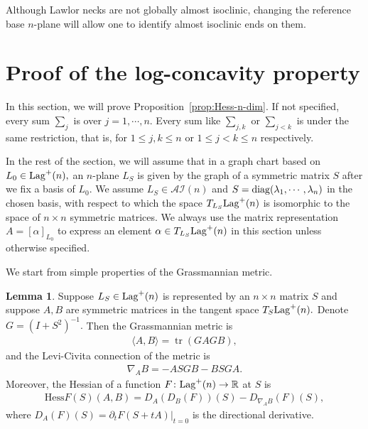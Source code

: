 \documentclass[11pt]{amsart}
\numberwithin{equation}{section}
\theoremstyle{definition}
\theoremstyle{definition}
\newtheorem{lemma}[equation]{Lemma}
\newcommand{\bb}[1]{\mathbb{#1}} \newcommand{\td}[1]{\widetilde{#1}}
\newcommand{\Hess}{\text{Hess}}
\newcommand{\bd}{\partial}
\begin{document}
Although Lawlor necks are not globally almost isoclinic, changing the reference base $n$-plane will allow one to identify almost isoclinic ends on them.



\section{\bf Proof of the log-concavity property}
\label{sec:proof-Lambda}

In this section, we will prove Proposition~\ref{prop:Hess-n-dim}.
If not specified, every sum $\sum\limits_j$ is over $j=1,\cdots,n.$
Every sum like $\sum\limits_{j,k}$ or $\sum\limits_{j<k}$ is under the same restriction, that is, for $1\le j,k\le n$ or $1\le j<k\le n$ respectively.



In the rest of the section, we will assume that in a graph chart based on $L_0\in{\rm Lag}^+(n),$ an $n$-plane $L_S$ is given by the graph of a symmetric matrix $S$ after we fix a basis of $L_0.$
We assume $L_S\in\mathcal{AI}(n)$ and $S={\rm diag}(\lambda_1,\cdots,\lambda_n)$ in the chosen basis, with respect to which the space $T_{L_S}{\rm Lag}^+(n)$ is isomorphic to the space of $n\times n$  symmetric matrices.
We always use the matrix representation $A=[\alpha]_{L_0}$ to express an element $\alpha\in T_{L_S}{\rm Lag}^+(n)$ in this section unless otherwise specified.


We start from simple properties of the Grassmannian metric.

\begin{lemma} 
	\label{lem:basic-prop}
	Suppose $L_S\in{\rm Lag}^+(n)$ is represented by an $n\times n$ matrix $S$ and suppose $A, B$ are symmetric matrices in the tangent space $T_S{\rm Lag}^+(n).$
	Denote
	$G = (I + S^2)^{-1}.$
	Then the Grassmannian metric is
	\begin{align}\label{metric-on-Lag}
	\langle A, B \rangle = \operatorname{tr}(G A G B),
	\end{align}
	and the Levi-Civita connection of the metric is
	\begin{align}\label{nabla-on-Lag}
	\nabla_A B = - A S G B - B S G A.
	\end{align}
	Moreover, the Hessian of a function $F\colon {\rm Lag}^+(n)\to\bb R$ at $S$ is
	\begin{align}\label{Hess-on-Lag}
	\Hess F(S) (A, B) = D_A(D_B(F))(S) - 
	D_{\nabla_A B}(F)(S),
	\end{align}
	where $D_A(F)(S)=\bd_t F(S+tA) |_{t=0}$ is the directional derivative. 
\end{lemma}
\end{document}
